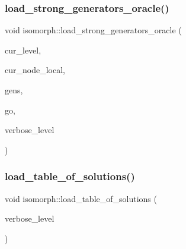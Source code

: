 \mbox{\label{classisomorph_ac4a38e041ec80fe0ea0dfce49629536b}} 
\subsubsection{\texorpdfstring{load\+\_\+strong\+\_\+generators\+\_\+oracle()}{load\_strong\_generators\_oracle()}}
{\footnotesize\ttfamily void isomorph\+::load\+\_\+strong\+\_\+generators\+\_\+oracle (\begin{DoxyParamCaption}\item[{\mbox{\hyperlink{galois_8h_a09fddde158a3a20bd2dcadb609de11dc}{I\+NT}}}]{cur\+\_\+level,  }\item[{\mbox{\hyperlink{galois_8h_a09fddde158a3a20bd2dcadb609de11dc}{I\+NT}}}]{cur\+\_\+node\+\_\+local,  }\item[{\mbox{\hyperlink{classvector__ge}{vector\+\_\+ge}} \&}]{gens,  }\item[{\mbox{\hyperlink{classlonginteger__object}{longinteger\+\_\+object}} \&}]{go,  }\item[{\mbox{\hyperlink{galois_8h_a09fddde158a3a20bd2dcadb609de11dc}{I\+NT}}}]{verbose\+\_\+level }\end{DoxyParamCaption})}

\mbox{\label{classisomorph_a21ab5aba74a200b9abf041dc5206821a}} 
\subsubsection{\texorpdfstring{load\+\_\+table\+\_\+of\+\_\+solutions()}{load\_table\_of\_solutions()}}
{\footnotesize\ttfamily void isomorph\+::load\+\_\+table\+\_\+of\+\_\+solutions (\begin{DoxyParamCaption}\item[{\mbox{\hyperlink{galois_8h_a09fddde158a3a20bd2dcadb609de11dc}{I\+NT}}}]{verbose\+\_\+level }\end{DoxyParamCaption})}

\mbox{\label{classisomorph_abd12747ffc397ec1d04907f9f1c4b4be}} 
